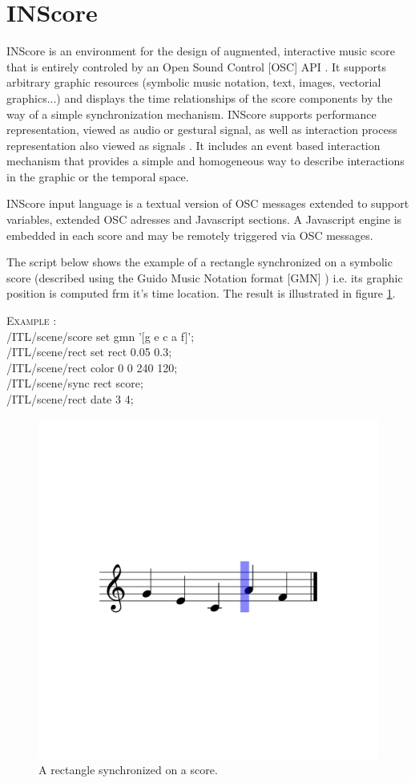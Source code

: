 \documentclass{article}
\newcounter{samplenum}
\newcommand{\sample}[1]		{ 	
								\begin{center}\colorbox{mygrey}{
								\begin{minipage}[t]{0.99\columnwidth} 
								\textsc{Example} \arabic{samplenum}: \vspace{1mm} \\
								\ttfamily \small #1  
								\end{minipage}}\end{center}
								\stepcounter{samplenum}
							}
\begin{document}
\section{INScore}\label{inscore}

INScore is an environment for the design of augmented, interactive music score \cite{Fober:12a} that is entirely controled by an Open Sound Control [OSC] API \cite{Fober:12a}. It supports arbitrary graphic resources (symbolic music notation, text, images, vectorial graphics...) and displays the time relationships of the score components by the way of a simple synchronization mechanism.
INScore supports performance representation, viewed as audio or gestural signal, as well as interaction process representation also viewed as signals \cite{Fober:14b}. It includes an event based interaction mechanism \cite{Fober:13b} that provides a simple and homogeneous way to describe interactions in the graphic or the temporal space.

INScore input language is a textual version of OSC messages extended to support variables, extended OSC adresses and Javascript sections. A Javascript engine is embedded  in each score and may be remotely triggered via OSC messages.

The script below shows the example of a rectangle synchronized on a symbolic score (described using the Guido Music Notation format [GMN] \cite{hoos98}) i.e. its graphic position is computed frm it's time location. The result is illustrated in figure \ref{fig:sample1}.
\sample{
  /ITL/scene/score set gmn '[g e c a f]';\\
  /ITL/scene/rect set rect 0.05 0.3;\\
  /ITL/scene/rect color 0 0 240 120;\\
  /ITL/scene/sync rect score;\\
  /ITL/scene/rect date 3 4;
}
\begin{figure}[h]
\centering
\includegraphics[width=0.60\columnwidth]{img/sample1}
\caption{A rectangle synchronized on a score.
\label{fig:sample1}}
\end{figure}
\end{document}
